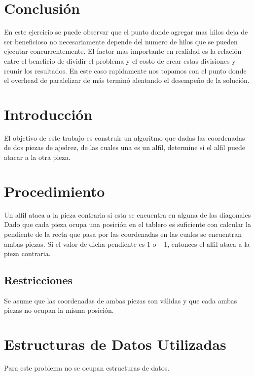 \documentclass{report}
\begin{document}
\section{Conclusión}

En este ejercicio se puede observar que el punto donde agregar mas hilos deja de ser
beneficioso no necesariamente depende del numero de hilos que se pueden ejecutar
concurrentemente. El factor mas importante en realidad es la relación entre el
beneficio de dividir el problema y el costo de crear estas divisiones y reunir los
resultados. En este caso rapidamente nos topamos con el punto donde el overhead
de paralelizar de más terminó alentando el desempeño de la solución.

%
\section{Introducci\'on}
El objetivo de este trabajo es construir un algoritmo que dadas las coordenadas de dos piezas de ajedrez, de las 
cuales una es un alfil, determine si el alfil puede atacar a la otra pieza.
%
\section{Procedimiento}
Un alfil ataca a la pieza contraria si esta se encuentra en alguna de las diagonales 
Dado que cada pieza ocupa una posici\'on en el tablero es suficiente con calcular la pendiente de la recta que pasa 
por las coordenadas en las cuales se encuentran ambas piezas. 
\newline
\newline
Si el valor de dicha pendiente es $1$ o $-1$, entonces el alfil ataca a la pieza contraria.    
%
\subsection{Restricciones}
Se asume que las coordenadas de ambas piezas son v\'alidas y que cada ambas piezas no ocupan la misma posici\'on.
%
\section{Estructuras de Datos Utilizadas}
Para este problema no se ocupan estructuras de datos.
%
\end{document}
